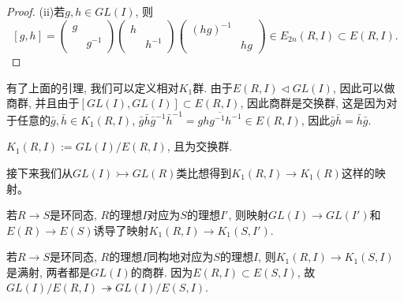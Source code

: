 \begin{proof}
	(ii)若$g,h\in GL(I)$, 则
	\[ [g,h]= \begin{pmatrix}
		g & \\
			& g^{-1}
	\end{pmatrix}\begin{pmatrix}
		h & \\
			& h^{-1}
	\end{pmatrix}\begin{pmatrix}
		(hg)^{-1} & \\
			& hg
	\end{pmatrix} \in E_{2n}(R,I) \subset E(R,I).\]

\end{proof}

有了上面的引理, 我们可以定义相对$K_1$群. 由于$E(R,I)\lhd GL(I)$, 因此可以做商群, 并且由于$[GL(I),GL(I)]\subset E(R,I)$, 因此商群是交换群, 这是因为对于任意的$\bar{g},\bar{h}\in K_1(R,I)$, $\bar{g} \bar{h} \bar{g}^{-1} \bar{h}^{-1}=\overline{ghg^{-1}h^{-1}}\in E(R,I)$, 因此$\bar{g}\bar{h}=\bar{h}\bar{g}$.
\begin{definition}
	$K_1(R,I):= GL(I)/E(R,I)$, 且为交换群.
\end{definition}

接下来我们从$GL(I) \rightarrowtail GL(R)$类比想得到$K_1(R,I)\rightarrow K_1(R)$这样的映射。

若$R\rightarrow S$是环同态, $R$的理想$I$对应为$S$的理想$I'$, 则映射$GL(I)\rightarrow GL(I')$和$E(R)\rightarrow E(S)$诱导了映射$K_1(R,I)\rightarrow K_1(S,I')$.

\begin{remark}
	若$R\rightarrow S$是环同态, $R$的理想$I$同构地对应为$S$的理想$I$, 则$K_1(R,I)\rightarrow K_1(S,I)$是满射, 两者都是$GL(I)$的商群. 因为$E(R,I)\subset E(S,I)$, 故$GL(I)/E(R,I)\twoheadrightarrow GL(I)/E(S,I)$.
\end{remark}